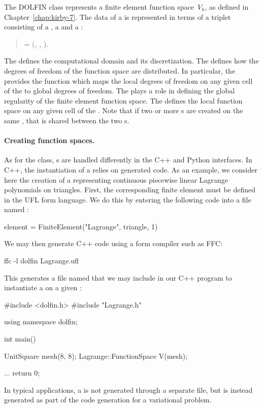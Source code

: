 The DOLFIN  class represents a finite element function
space~$V_h$, as defined in Chapter~\ref{chap:kirby-7}. The data of a
 is represented in terms of a triplet consisting of
a , a  and a :
\begin{verse}
  \centering
   = (,\; ,\; ).
\end{verse}
The  defines the computational domain and its
discretization. The  defines how the degrees of freedom
of the function space are distributed. In particular, the 
provides the function  which maps the local degrees
of freedom on any given cell of the  to global degrees of
freedom. The  plays a role in defining the global regularity
of the finite element function space.  The  defines
the local function space on any given cell of the . Note that
if two or more s are created on the same ,
that  is shared between the two s.

\paragraph{Creating function spaces.}

As for the  class, s are handled
differently in the C++ and Python interfaces. In C++, the instantiation
of a  relies on generated code. As an example,
we consider here the creation of a  representing
continuous piecewise linear Lagrange polynomials on triangles. First,
the corresponding finite element must be defined in the UFL form
language. We do this by entering the following code into a file named
:
\begin{uflcode}
element = FiniteElement("Lagrange", triangle, 1)
\end{uflcode}
We may then generate C++ code using a form compiler such as FFC:
\begin{bash}
ffc -l dolfin Lagrange.ufl
\end{bash}
This generates a file named  that we may include in
our C++ program to instantiate a  on a given
:
\begin{c++}
#include <dolfin.h>
#include "Lagrange.h"

using namespace dolfin;

int main()
{
  UnitSquare mesh(8, 8);
  Lagrange::FunctionSpace V(mesh);

  ...
  return 0;
}
\end{c++}
In typical applications, a  is not generated
through a separate  file, but is instead generated as part
of the code generation for a variational problem.

